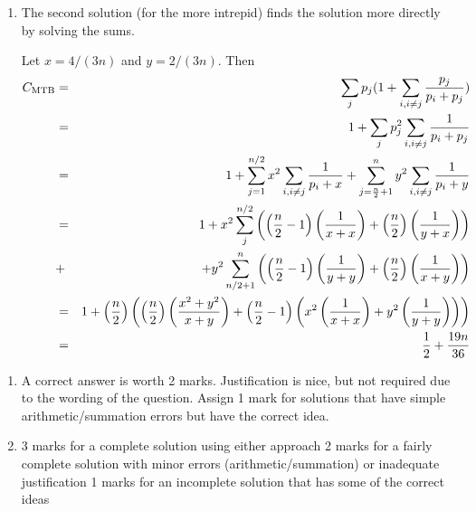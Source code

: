 \begin{solution}
\begin{enumerate}
\begin{enumerate}
	\item The second solution (for the more intrepid) finds the solution more directly
	by solving the sums.

	 Let $x=4/(3n)$ and $y=2/(3n)$. Then
	 \begin{eqnarray*}
	 C_{\hbox{\scriptsize MTB}} &= &
	  \sum_j p_j(1+ \sum_{i,i\neq j} \frac{p_j}{p_i+p_j})\\
	  & = & 1 + \sum_j p_j^2 \sum_{i,i\neq j} \frac{1}{p_i+p_j}\\
	  & = & 1 + \sum_{j=1}^{n/2}x^2 \sum_{i,i\neq j} \frac{1}{p_i+x} + \sum_{j=\frac{n}{2} + 1}^{n}y^2 \sum_{i,i\neq j} \frac{1}{p_i+y} \\
	  & = & 1 + x^2 \sum_{j}^{n/2} \left ( \left (\frac{n}{2} - 1\right)
    \left (\frac{1}{x+x}\right) + \left(\frac{n}{2}\right )
   \left (\frac{1}{y+x}\right ) \right ) \\
	  & + &   + y^2 \sum_{n/2 + 1}^{n}  \left ( \left (\frac{n}{2} - 1
       \right ) \left (\frac{1}{y+y}\right ) + \left (\frac{n}{2}\right )
    \left (\frac{1}{x+y} \right ) \right ) \\
	  & = & 1 + \left (\frac{n}{2} \right )
	 \left (
	 \left (\frac{n}{2} \right)
	 \left (\frac{x^2+y^2}{x+y}\right ) +
	 \left (\frac{n}{2} -1\right ) \left (x^2\left( \frac{1}{x+x} \right )
	 + y^2\left(\frac{1}{y+y}\right) \right )
	 \right ) \\
	  & = & \frac{1}{2} + \frac{19n}{36}
	 \end{eqnarray*}
     \end{enumerate}
  \end{enumerate}
\end{solution}

\begin{INUTILE}
  \begin{markingScheme}
    \begin{enumerate}

    \item A correct answer is worth 2 marks. Justification is nice,
      but not required due to the wording of the question.  Assign 1
      mark for solutions that have simple arithmetic/summation errors
      but have the correct idea.

    \item 3 marks for a complete solution using either approach 2
      marks for a fairly complete solution with minor errors
      (arithmetic/summation) or inadequate justification 1 marks for
      an incomplete solution that has some of the correct ideas

    \end{enumerate}
\end{markingScheme}
\end{INUTILE}
